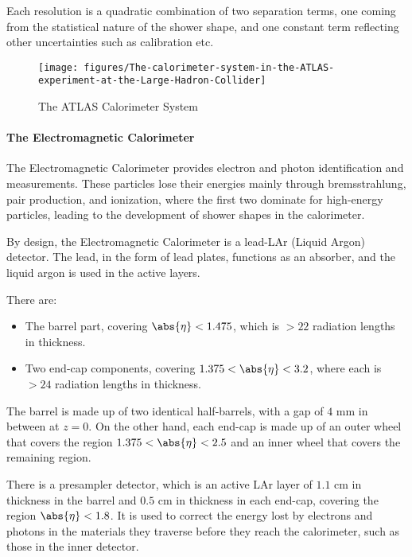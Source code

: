 Each resolution is a quadratic combination of two separation terms, one coming
from the statistical nature of the shower shape, and one constant term
reflecting other uncertainties such as calibration etc.

\begin{figure}[H]
	\texttt{[image: figures/The-calorimeter-system-in-the-ATLAS-experiment-at-the-Large-Hadron-Collider]}
	\centering
	\caption{The ATLAS Calorimeter System}\cite{atlasdetector}
	\label{f:emc}
\end{figure}

\paragraph{The Electromagnetic Calorimeter}\label{p:emc} The Electromagnetic
Calorimeter provides electron and photon identification and measurements. These
particles lose their energies mainly through bremsstrahlung, pair production,
and ionization, where the first two dominate for high-energy particles, leading
to the development of shower shapes in the calorimeter.

By design, the Electromagnetic Calorimeter is a lead-LAr (Liquid Argon)
detector. The lead, in the form of lead plates, functions as an absorber, and
the liquid argon is used in the active layers.


\vspace{3mm}

There are:

\begin{itemize}

	\item The barrel part, covering $\abs{\eta} < 1.475 $, which is $> 22$
	      radiation lengths in thickness.

	\item Two end-cap components, covering $1.375 < \abs{\eta} < 3.2$, where each
	      is $>24$ radiation lengths in thickness.

\end{itemize}

The barrel is made up of two identical half-barrels, with a gap of $4$ mm in
between at $z=0$. On the other hand, each end-cap is made up of an outer wheel
that covers the region $1.375 < \abs{\eta} < 2.5$ and an inner wheel that
covers the remaining region.

There is a presampler detector, which is an active LAr layer of $1.1$ cm in
thickness in the barrel and $0.5$ cm in thickness in each end-cap, covering the
region $\abs{\eta} < 1.8$. It is used to correct the energy lost by electrons
and photons in the materials they traverse before they reach the calorimeter,
such as those in the inner detector.



